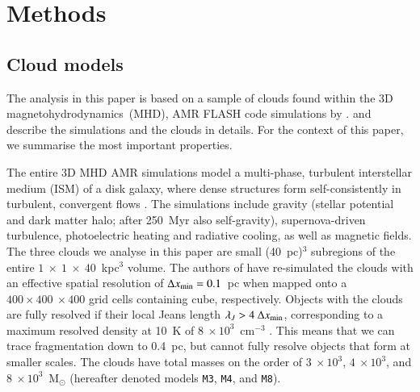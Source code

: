 \section{Methods}\label{methods}


\subsection{Cloud models}\label{methods:clouds}


The analysis in this paper is based on a sample of clouds found within the 3D magnetohydrodynamics~(MHD), AMR FLASH code \citep{Fryxell2000} simulations by \citet{IbanezMejia2016}.
\citet[hereafter  and , respectively]{IbanezMejia2016,IbanezMejia2017} and \citet[hereafter ]{Chira2017} describe the simulations and the clouds in details. 
For the context of this paper, we summarise the most important properties. 

The entire 3D MHD AMR simulations model a multi-phase, turbulent interstellar medium (ISM) of a disk galaxy, where dense structures form self-consistently in turbulent, convergent flows . 
The simulations include gravity (stellar potential and dark matter halo; after 250~Myr also self-gravity), supernova-driven turbulence, photoelectric heating and radiative cooling, as well as magnetic fields. 
The three clouds we analyse in this paper are small (40~pc)$^{3}$ subregions of the entire $1~\times~1~\times~40$~kpc$^3$ volume.
The authors of  have re-simulated the clouds with an effective spatial resolution of $\Delta x_{\rm min}=0.1$~pc when mapped onto a $400\times 400~\times 400$ grid cells containing cube, respectively.
Objects with the clouds are fully resolved if their local Jeans length $\lambda_J > 4~\Delta x_{\rm min}$, corresponding to a maximum resolved density at 10~K of $8~\times 10^3$~cm$^{-3}$ .
This means that we can trace fragmentation down to 0.4~pc, but cannot fully resolve objects that form at smaller scales.
The clouds have total masses on the order of $3~\times 10^3$, $4~\times 10^3$, and $8~\times 10^3$~M$_{\odot}$ (hereafter denoted models \texttt{M3}, \texttt{M4}, and \texttt{M8}).


